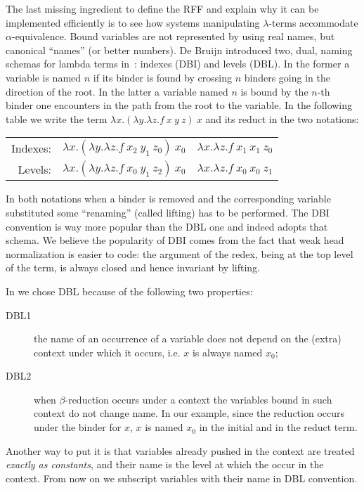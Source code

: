 \documentclass{llncs}
\begin{document}
The last missing ingredient to define the RFF and explain why it can be
implemented efficiently is to see how systems manipulating $\lambda$-terms
accommodate
$\alpha$-equivalence.  Bound variables are not represented by using
real names, but canonical ``names'' (or better numbers).  De Bruijn introduced
two, dual, naming schemas for lambda terms in~\cite{debruijnlevel}:
indexes (DBI) and levels
(DBL).  In the former a variable is named $n$ if its binder is found by
crossing $n$ binders going in the direction of the root.  In the latter a
variable named $n$ is bound by the $n$-th binder one encounters in the path
from the root to the variable.
In the following table we write the term $\lambda x.(\lambda y.\lambda z.f~x~y~z)~x$ and its reduct in the two notations:
\vspace{-0.8em}
\begin{center}
\begin{tabular}{r@{~~}c@{~$\to_\beta$~}c}
Indexes: & $\lambda x.(\lambda y.\lambda z.f~x_2~y_1~z_0)~x_0$ &
$\lambda x.\lambda z.f~x_1~x_1~z_0$  \\
Levels: & $\lambda x.(\lambda y.\lambda z.f~x_0~y_1~z_2)~x_0$ &
$\lambda x.\lambda z.f~x_0~x_0~z_1$ \\
\end{tabular}
\end{center}
\vspace{-0.2em}
In both notations when a binder is removed and the corresponding variable
substituted some ``renaming'' (called lifting) has to be performed.  
The DBI convention is way more popular than the DBL one and \tedius{}
indeed adopts that schema.  We believe the popularity of DBI comes from the
fact that weak head normalization is easier to code: the argument of the
redex, being at the top level of the term, is always closed and hence
invariant by lifting.

In \elpi{} we chose DBL because of the following two properties:
\begin{description}
\item[DBL1] the name of an occurrence of a variable does not depend on the (extra) context under which it occurs, i.e. $x$ is always named $x_0$;
\item[DBL2]
when $\beta$-reduction occurs under a context the variables bound
in such context do not change name. In our example, since the reduction occurs
under the binder for $x$, $x$ is named $x_0$ in the initial and in the reduct
term.
\end{description}
Another way to put it is that variables already pushed in the context
are treated \emph{exactly as constants}, and their name is the level at
which the occur in the context.  From now on we subscript variables
with their name in DBL convention.
\end{document}
